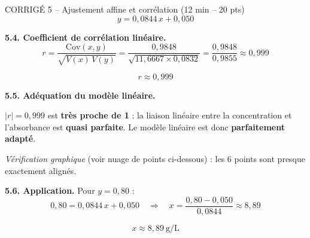 \documentclass[11pt,a4paper]{article}
\begin{document}
\begin{epreuve}{CORRIGÉ 5 -- Ajustement affine et corrélation \hfill \small (12 min -- 20 pts)}
$$\boxed{y = 0{,}0844\,x + 0{,}050}$$

\vspace{0.3cm}
\textbf{5.4. Coefficient de corrélation linéaire.}
$$r = \frac{\mathrm{Cov}(x,y)}{\sqrt{V(x)\,V(y)}} = \frac{0{,}9848}{\sqrt{11{,}6667 \times 0{,}0832}} = \frac{0{,}9848}{0{,}9855} \approx 0{,}999$$

$$\boxed{r \approx 0{,}999}$$

\vspace{0.3cm}
\textbf{5.5. Adéquation du modèle linéaire.}

$|r| = 0{,}999$ est \textbf{très proche de 1} : la liaison linéaire entre la concentration et l'absorbance est \textbf{quasi parfaite}. Le modèle linéaire est donc \textbf{parfaitement adapté}.

\medskip
\emph{Vérification graphique} (voir nuage de points ci-dessous) : les 6 points sont presque exactement alignés.

\vspace{0.3cm}
\textbf{5.6. Application.} Pour $y = 0{,}80$ :
$$0{,}80 = 0{,}0844\,x + 0{,}050 \quad\Rightarrow\quad x = \frac{0{,}80 - 0{,}050}{0{,}0844} \approx 8{,}89$$

$$\boxed{x \approx 8{,}89\ \text{g/L}}$$

\end{epreuve}

\vspace{0.3cm}
\end{document}
